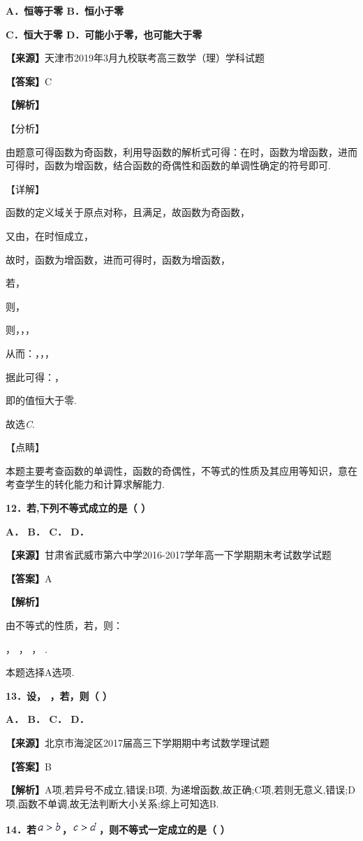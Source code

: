 \documentclass[
]{article}
\begin{document}
\textbf{A．恒等于零 B．恒小于零}

\textbf{C．恒大于零 D．可能小于零，也可能大于零}

\textbf{【来源】}天津市2019年3月九校联考高三数学（理）学科试题

\textbf{【答案】}C

\textbf{【解析】}

【分析】

由题意可得函数为奇函数，利用导函数的解析式可得：在时，函数为增函数，进而可得时，函数为增函数，结合函数的奇偶性和函数的单调性确定的符号即可.

【详解】

函数的定义域关于原点对称，且满足，故函数为奇函数，

又由，在时恒成立，

故时，函数为增函数，进而可得时，函数为增函数，

若，

则，

则，，，

从而：，，，

据此可得：，

即的值恒大于零.

故选\emph{C}.

【点睛】

本题主要考查函数的单调性，函数的奇偶性，不等式的性质及其应用等知识，意在考查学生的转化能力和计算求解能力.

\textbf{12．若,下列不等式成立的是（ ）}

\textbf{A． B． C． D．}

\textbf{【来源】}甘肃省武威市第六中学2016-2017学年高一下学期期末考试数学试题

\textbf{【答案】}A

\textbf{【解析】}

由不等式的性质，若，则：

， ， ， .

本题选择A选项.

\textbf{13．设， ，若，则（ ）}

\textbf{A． B． C． D．}

\textbf{【来源】}北京市海淀区2017届高三下学期期中考试数学理试题

\textbf{【答案】}B

\textbf{【解析】}A项,若异号不成立,错误;B项,
为递增函数,故正确;C项,若则无意义,错误;D项,函数不单调,故无法判断大小关系;综上可知选B.

\textbf{14．若}\includegraphics[width=0.38547in,height=0.19794in]{Fig//media/image151.png}\textbf{，}\includegraphics[width=0.40631in,height=0.19794in]{Fig//media/image152.png}\textbf{，则不等式一定成立的是（
）}
\end{document}
